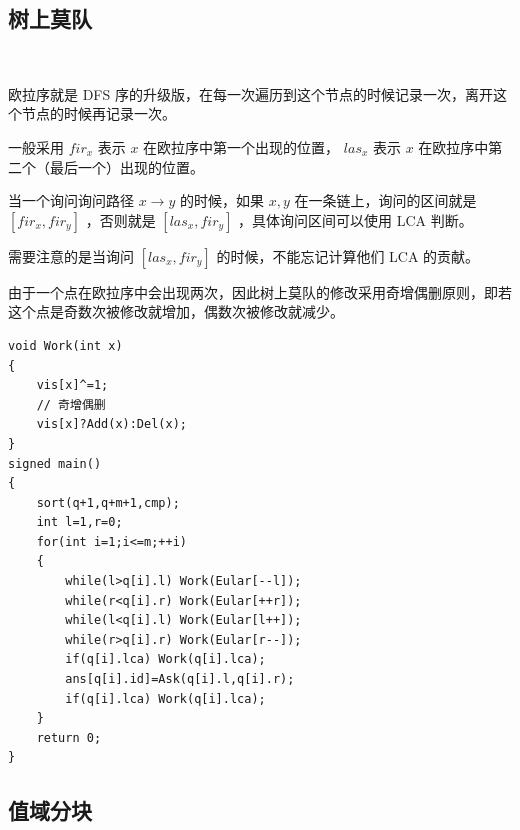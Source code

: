 \subsection{树上莫队}
~\\
\par \noindent 欧拉序就是 DFS 序的升级版，在每一次遍历到这个节点的时候记录一次，离开这个节点的时候再记录一次。
~\\
\par \noindent 一般采用 $fir_x$ 表示 $x$ 在欧拉序中第一个出现的位置， $las_x$ 表示 $x$ 在欧拉序中第二个（最后一个）出现的位置。
~\\
\par \noindent 当一个询问询问路径 $x \rightarrow y$ 的时候，如果 $x, y$ 在一条链上，询问的区间就是 $[fir_x, fir_y]$ ，否则就是 $[las_x,fir_y]$ ，具体询问区间可以使用 LCA 判断。
~\\
\par \noindent 需要注意的是当询问 $\left[las_x, fir_y\right]$ 的时候，不能忘记计算他们 LCA 的贡献。
~\\
\par \noindent 由于一个点在欧拉序中会出现两次，因此树上莫队的修改采用奇增偶删原则，即若这个点是奇数次被修改就增加，偶数次被修改就减少。
\begin{verbatim}
void Work(int x)
{
    vis[x]^=1;
    // 奇增偶删
    vis[x]?Add(x):Del(x);
}
signed main()
{
    sort(q+1,q+m+1,cmp);
    int l=1,r=0;
    for(int i=1;i<=m;++i)
    {
        while(l>q[i].l) Work(Eular[--l]);
        while(r<q[i].r) Work(Eular[++r]);
        while(l<q[i].l) Work(Eular[l++]);
        while(r>q[i].r) Work(Eular[r--]);
        if(q[i].lca) Work(q[i].lca);
        ans[q[i].id]=Ask(q[i].l,q[i].r);
        if(q[i].lca) Work(q[i].lca);
    }
    return 0;
}
\end{verbatim}

\subsection{值域分块}

